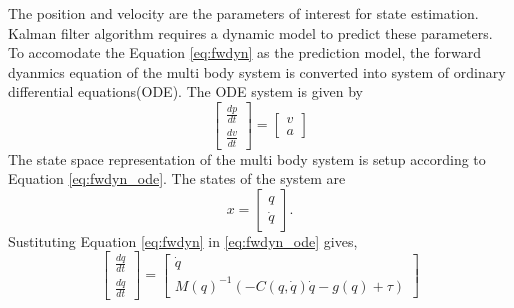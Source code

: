 The position and velocity are the parameters of interest for state estimation. Kalman filter algorithm requires a dynamic model to predict these parameters. To accomodate the Equation \ref{eq:fwdyn} as the prediction model, the forward dyanmics equation of the multi body system is converted into system of ordinary differential equations(ODE). The ODE system is given by
\begin{equation}
    \label{eq:fwdyn_ode}
    \begin{bmatrix} \frac{dp}{dt}  \\ \frac{dv}{dt} \end{bmatrix} = 
    \begin{bmatrix} v \\ a \end{bmatrix}
\end{equation}
 The state space representation of the multi body system is setup according to Equation \ref{eq:fwdyn_ode}. The states of the system are
\begin{equation}
    x = \begin{bmatrix} q \\ \dot q \end{bmatrix}.
\end{equation}
Sustituting Equation \ref{eq:fwdyn} in \ref{eq:fwdyn_ode} gives, 
\begin{equation}
    \label{eq:dyn_ss}
    \begin{bmatrix} \frac{dq}{dt} \\ \frac{d \dot q}{dt} \end{bmatrix} =
    \begin{bmatrix}
    \dot q \\
    M(q)^{-1} \left( -C(q,\dot{q})\dot{q} - g(q) + \tau \right )
    \end{bmatrix}
\end{equation}


